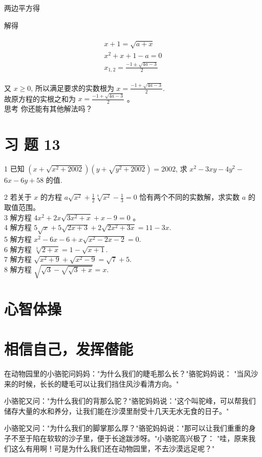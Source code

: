 \documentclass[10pt]{article}
\begin{document}
两边平方得

解得

\begin{align*}
\begin{gathered}
x+1=\sqrt{a+x} \\
x^{2}+x+1-a=0 \\
x_{1,2}=\frac{-1 \pm \sqrt{4 a-3}}{2}
\end{gathered}
\end{align*}

又 $x \geqslant 0$, 所以满足要求的实数根为 $x=\frac{-1+\sqrt{4 a-3}}{2}$.\\
故原方程的实根之和为 $x=\frac{-1+\sqrt{4 a-3}}{2}$ 。\\
思考 你还能有其他解法吗？

\section*{习 题 13}
1 已知 $\left(x+\sqrt{x^{2}+2002}\right)\left(y+\sqrt{y^{2}+2002}\right)=2002$, 求 $x^{2}-3 x y-4 y^{2}-$ $6 x-6 y+58$ 的值.

2 若关于 $x$ 的方程 $a \sqrt{x^{2}}+\frac{1}{2} \sqrt[4]{x^{2}}-\frac{1}{3}=0$ 恰有两个不同的实数解，求实数 $a$ 的取值范围。\\
3 解方程 $4 x^{2}+2 x \sqrt{3 x^{2}+x}+x-9=0$ 。\\
4 解方程 $5 \sqrt{x}+5 \sqrt{2 x+3}+2 \sqrt{2 x^{2}+3 x}=11-3 x$.\\
5 解方程 $x^{2}-6 x-6+x \sqrt{x^{2}-2 x-2}=0$.\\
6 解方程 $\sqrt[3]{2+x}=1-\sqrt{x+1}$.\\
7 解方程 $\sqrt{x^{2}+9}+\sqrt{x^{2}-9}=\sqrt{7}+5$.\\
8 解方程 $\sqrt{\sqrt{3}-\sqrt{\sqrt{3}+x}}=x$.

\section*{心智体操}
\section*{相信自己，发挥僣能}
在动物园里的小骆驼问妈妈："为什么我们的睫毛那么长？"骆驼妈妈说： "当风沙来的时候，长长的睫毛可以让我们挡住风沙看清方向。"

小骆驼又问："为什么我们的背那么驼？"骆驼妈妈说："这个叫驼峰，可以帮我们储存大量的水和养分，让我们能在沙漠里耐受十几天无水无食的日子。"

小骆驼又问："为什么我们的脚掌那么厚？"骆驼妈妈说："那可以让我们重重的身子不至于陷在软软的沙子里，便于长途跋涉呀。"小骆驼高兴极了： "哇，原来我们这么有用啊！可是为什么我们还在动物园里，不去沙漠远足呢？"
\end{document}
